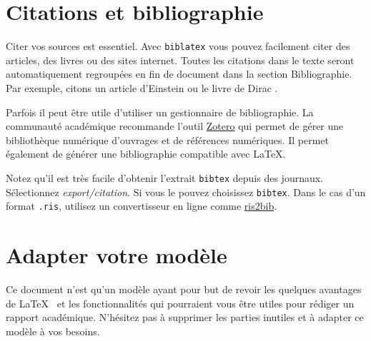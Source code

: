 \section{Citations et bibliographie}
Citer vos sources est essentiel. Avec \texttt{biblatex} vous pouvez facilement citer des articles, des livres ou des sites internet. Toutes les citations dans le texte seront automatiquement regroupées en fin de document dans la section \guillemotleft Bibliographie\guillemotright. Par exemple, citons un article d'Einstein \cite{einstein} ou le livre de Dirac \cite{dirac}.

Parfois il peut être utile d'utiliser un gestionnaire de bibliographie. La communauté académique recommande l'outil \href{https://www.zotero.org/}{Zotero} qui permet de gérer une bibliothèque numérique d'ouvrages et de références numériques. Il permet également de générer une bibliographie compatible avec \LaTeX.

Notez qu'il est très facile d'obtenir l'extrait \texttt{bibtex} depuis des journaux. Sélectionnez \emph{export/citation}. Si vous le pouvez choisissez \texttt{bibtex}. Dans le cas d'un format \texttt{.ris}, utilisez un convertisseur en ligne comme \href{http://www.bruot.org/ris2bib/}{ris2bib}.

\section{Adapter votre modèle}
Ce document n'est qu'un modèle ayant pour but de revoir les quelques avantages de \LaTeX~ et les fonctionnalités qui pourraient vous être utiles pour rédiger un rapport académique. N'hésitez pas à supprimer les parties inutiles et à adapter ce modèle à vos besoins.
